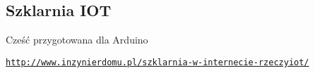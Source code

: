 \subsection*{Szklarnia I\+OT}

Cześć przygotowana dla Arduino

\href{http://www.inzynierdomu.pl/szklarnia-w-internecie-rzeczyiot/}{\tt http\+://www.\+inzynierdomu.\+pl/szklarnia-\/w-\/internecie-\/rzeczyiot/} 